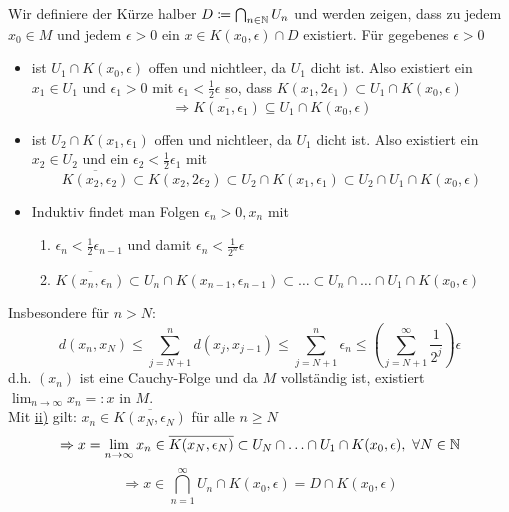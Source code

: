 \begin{beweis}
    Wir definiere der Kürze halber $D \coloneqq \bigcap_{n \in \mathbb{N}} U_{n}$ und werden zeigen, dass zu jedem $x_{0} \in M$ und jedem $\epsilon > 0$ ein $x \in K(x_{0}, \epsilon) \cap D$ existiert. Für gegebenes $\epsilon > 0$
	\begin{itemize}
		\item ist $U_{1} \cap K(x_{0}, \epsilon)$ offen und nichtleer, da $U_{1}$ dicht ist. Also existiert ein $x_{1} \in U_{1}$ und $\epsilon_{1} > 0$ mit $\epsilon_{1} < \frac{1}{2} \epsilon$ so, dass $K( x_{1}, 2 \epsilon_{1}) \subset U_{1} \cap K(x_{0}, \epsilon)$
			\[ \Rightarrow \overline{K(x_{1}, \epsilon_{1})} \subseteq U_{1} \cap K(x_{0}, \epsilon) \]
		\item ist $U_{2} \cap K(x_{1}, \epsilon_{1})$  offen und nichtleer, da $U_{1}$ dicht ist. Also existiert ein $x_{2} \in U_{2}$ und ein $\epsilon_{2} < \frac{1}{2} \epsilon_{1}$ mit
			\[ \overline{K(x_{2}, \epsilon_{2})} \subset K(x_{2}, 2 \epsilon_{2}) \subset U_{2} \cap K(x_{1}, \epsilon_{1}) \subset U_{2} \cap U_{1} \cap K(x_{0}, \epsilon) \]
		\item Induktiv findet man Folgen $\epsilon_{n} > 0, x_{n}$ mit
			\begin{enumerate}[label=(\roman*\upshape)]
				\item $\epsilon_{n} < \frac{1}{2} \epsilon_{n - 1}$ und damit $\epsilon_{n} < \frac{1}{2^{n}} \epsilon$
				\label{satz:9.1-proof-ii}
				\item $\overline{K(x_{n}, \epsilon_{n})} \subset U_{n} \cap K(x_{n - 1}, \epsilon_{n - 1}) \subset \dotsc \subset U_{n} \cap \dotsc \cap U_{1} \cap K(x_{0}, \epsilon)$
			\end{enumerate}
	\end{itemize}
	Insbesondere für $n > N$:
	\[ d(x_{n}, x_{N}) \leq \sum_{j = N + 1}^{n} d(x_{j}, x_{j - 1}) \leq \sum_{j = N + 1}^{n} \epsilon_{n} \leq \left( \sum_{j = N + 1}^{\infty} \frac{1}{2^{j}} \right) \epsilon \]
	d.h. $(x_{n})$ ist eine Cauchy-Folge und da $M$ vollständig ist, existiert $\lim_{n \rightarrow \infty} x_{n} =: x$ in $M$. \\
	Mit \hyperref[satz:9.1-proof-ii]{ii)} gilt: $x_{n} \in \overline{K(x_{N}, \epsilon_{N})}$ für alle $n \geq N$
	\[ \Rightarrow x = \lim_{n \rightarrow \infty} x_{n} \in \overline{K(x_{N}, \epsilon_{N})} \subset U_{N} \cap \dotsc \cap U_{1} \cap K(x_{0}, \epsilon), ~ \forall N \in \mathbb{N} \]
	\[ \Rightarrow x \in \bigcap_{n = 1}^{\infty} U_{n} \cap K(x_{0}, \epsilon) = D \cap  K(x_{0}, \epsilon) \]
\end{beweis}


